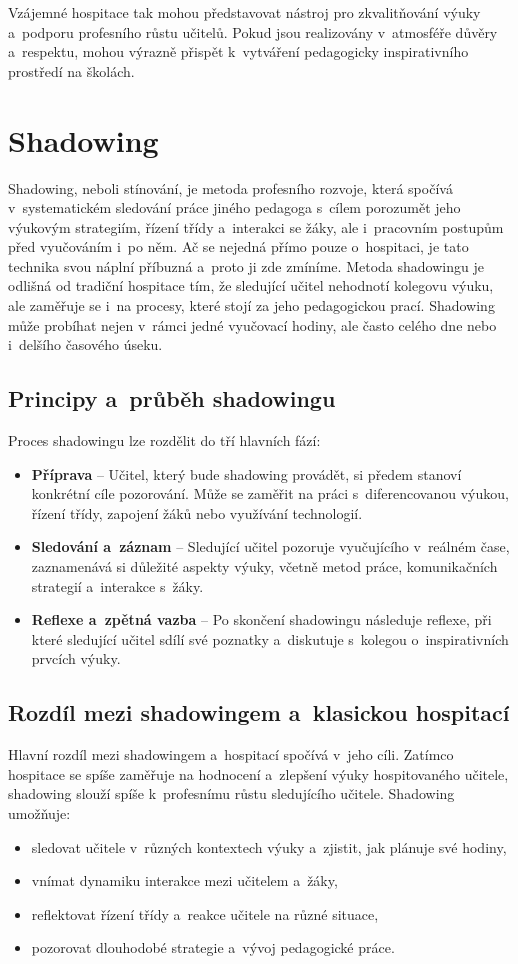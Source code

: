 Vzájemné hospitace tak mohou představovat nástroj pro zkvalitňování výuky a~podporu profesního růstu učitelů. Pokud jsou realizovány v~atmosféře důvěry a~respektu, mohou výrazně přispět k~vytváření pedagogicky inspirativního prostředí na školách.

\section{Shadowing}
Shadowing, neboli stínování, je metoda profesního rozvoje, která spočívá v~systematickém sledování práce jiného pedagoga s~cílem porozumět jeho výukovým strategiím, řízení třídy a~interakci se žáky, ale i~pracovním postupům před vyučováním i~po něm. Ač se nejedná přímo pouze o~hospitaci, je tato technika svou náplní příbuzná a~proto ji zde zmíníme. Metoda shadowingu je odlišná od tradiční hospitace tím, že sledující učitel nehodnotí kolegovu výuku, ale zaměřuje se i~na procesy, které stojí za jeho pedagogickou prací. Shadowing může probíhat nejen v~rámci jedné vyučovací hodiny, ale často celého dne nebo i~delšího časového úseku.

\subsection{Principy a~průběh shadowingu}
Proces shadowingu lze rozdělit do tří hlavních fází:
\begin{itemize}
    \item \textbf{Příprava} – Učitel, který bude shadowing provádět, si předem stanoví konkrétní cíle pozorování. Může se zaměřit na práci s~diferencovanou výukou, řízení třídy, zapojení žáků nebo využívání technologií.
    \item \textbf{Sledování a~záznam} – Sledující učitel pozoruje vyučujícího v~reálném čase, zaznamenává si důležité aspekty výuky, včetně metod práce, komunikačních strategií a~interakce s~žáky.
    \item \textbf{Reflexe a~zpětná vazba} – Po skončení shadowingu následuje reflexe, při které sledující učitel sdílí své poznatky a~diskutuje s~kolegou o~inspirativních prvcích výuky. 
\end{itemize}

\subsection{Rozdíl mezi shadowingem a~klasickou hospitací}
Hlavní rozdíl mezi shadowingem a~hospitací spočívá v~jeho cíli. Zatímco hospitace se spíše zaměřuje na hodnocení a~zlepšení výuky hospitovaného učitele, shadowing slouží spíše k~profesnímu růstu sledujícího učitele. Shadowing umožňuje:
\begin{itemize}
    \item sledovat učitele v~různých kontextech výuky a~zjistit, jak plánuje své hodiny,
    \item vnímat dynamiku interakce mezi učitelem a~žáky,
    \item reflektovat řízení třídy a~reakce učitele na různé situace,
    \item pozorovat dlouhodobé strategie a~vývoj pedagogické práce.
\end{itemize}

